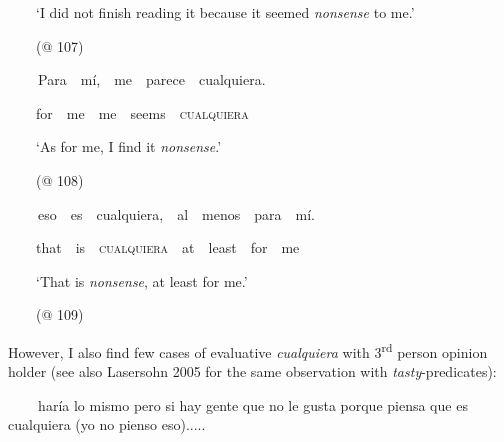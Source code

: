 \begin{styleStandard}
\ \ \ \ ‘I did not finish reading it because it seemed \textit{nonsense} to me.’
\end{styleStandard}

\begin{styleStandard}
\ \ \ \ (@ 107)
\end{styleStandard}

\begin{styleStandard}
\textbf{\ \ }\ \ Para\ \ mí,\ \ me\ \ parece\ \ cualquiera.
\end{styleStandard}

\begin{styleStandard}
\ \ \ \ for\ \ me\ \ me\ \ seems\ \ \textsc{cualquiera}
\end{styleStandard}

\begin{styleStandard}
\ \ \ \ ‘As for me, I find it \textit{nonsense}.’
\end{styleStandard}

\begin{styleStandard}
\ \ \ \ (@ 108)
\end{styleStandard}

\begin{styleStandard}
\textbf{\ \ }\ \ eso\ \ es\ \ cualquiera,\ \ al\ \ menos\ \ para\ \ mí.
\end{styleStandard}

\begin{styleStandard}
\ \ \ \ that\ \ is\ \ \textsc{cualquiera}\ \ at\ \ least\ \ for\ \ me
\end{styleStandard}

\begin{styleStandard}
\ \ \ \ ‘That is \textit{nonsense}, at least for me.’
\end{styleStandard}

\begin{styleStandard}
\ \ \ \ (@ 109)
\end{styleStandard}

\begin{styleStandard}
However, I also find few cases of evaluative \textit{cualquiera} with 3\textsuperscript{rd} person opinion holder (see also Lasersohn 2005 for the same observation with \textit{tasty}{}-predicates):
\end{styleStandard}

\begin{styleStandard}
\textbf{\ \ }\ \ haría lo mismo pero si hay gente que no le gusta porque piensa que es cualquiera (yo no pienso eso).....
\end{styleStandard}

